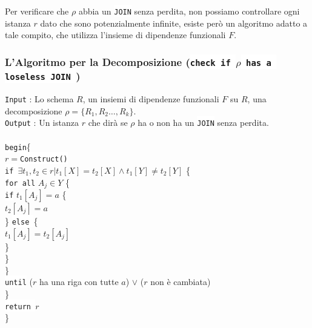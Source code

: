 \documentclass[12pt, letterpaper]{article}
\newcommand{\code}[1]{\colorbox{light-gray}{\texttt{#1}}}
\newcommand{\codee}[1]{\colorbox{white}{\texttt{#1}}}
\newcommand{\acc}{\\\hphantom{}\\}
\begin{document}
Per verificare che \(\rho\) abbia un \codee{JOIN} senza perdita, non possiamo controllare ogni istanza \(r\) dato che sono 
potenzialmente infinite, esiste però un algoritmo adatto a tale compito, che utilizza 
l'insieme di dipendenze funzionali \(F\).
\subsubsection{L'Algoritmo per la Decomposizione (\codee{check if }\(\rho\)\codee{ has a loseless JOIN })}
\code{Input} : Lo schema \(R\), un insiemi di dipendenze funzionali \(F\) su \(R\), una decomposizione \(\rho=\{R_1,R_2\dots,R_k\}\).\\
\code{Output} : Un istanza \(r\) che dirà se \(\rho\) ha o non ha un \codee{JOIN} senza perdita.\acc
\hphantom{ident}\codee{begin}\{\\
\hphantom{ident}\hphantom{ident} \(r=\)\codee{Construct()}\\ 
\hphantom{ident}\hphantom{ident}\hphantom{ident} \codee{if }\(\exists t_1,t_2\in r|t_1[X]=t_2[X]\land t_1[Y]\ne t_2[Y]\) \{\\ 
\hphantom{ident}\hphantom{ident}\hphantom{ident}\hphantom{ident} \codee{for all} \( A_j\in Y \) \{ \\  
\hphantom{ident}\hphantom{ident}\hphantom{ident}\hphantom{ident}\hphantom{ident} \codee{if} \(t_1[A_j]=a\) \{ \\
\hphantom{ident}\hphantom{ident}\hphantom{ident}\hphantom{ident}\hphantom{ident}\(t_2[A_j]=a\) \\
\hphantom{ident}\hphantom{ident}\hphantom{ident}\hphantom{ident}\hphantom{ident} \} \codee{else }\{\\
\hphantom{ident}\hphantom{ident}\hphantom{ident}\hphantom{ident}\hphantom{ident} \(t_1[A_j]=t_2[A_j]\)\\
\hphantom{ident}\hphantom{ident}\hphantom{ident}\hphantom{ident}\hphantom{ident} \} \\
\hphantom{ident}\hphantom{ident}\hphantom{ident}\hphantom{ident} \} \\
\hphantom{ident}\hphantom{ident}\hphantom{ident}\} \\
\hphantom{ident}\hphantom{ident}\hphantom{ident} \codee{until} (\(r\) ha una riga con tutte \(a\)) \(\lor\) (\(r\) non è cambiata)\\
\hphantom{ident}\hphantom{ident} \}\\ 
\hphantom{ident}\hphantom{ident} \codee{return }\(r\)\\ 
\hphantom{ident}\}\acc
\end{document}
